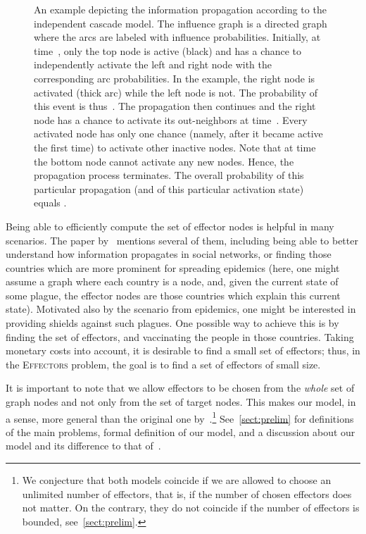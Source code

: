 \documentclass{article}
\newcommand{\probEffectors}{\textsc{Effectors}\xspace}
\begin{document}
\begin{figure}
    \caption{An example depicting the information propagation according to the independent cascade model. The influence graph is a directed graph where the arcs are labeled with influence probabilities. Initially, at time~, only the top node is active (black) and has a chance to independently activate the left and right node with the corresponding arc probabilities.
      In the example, the right node is activated (thick arc) while the left node is not. The probability of this event is thus~. The propagation then continues and the right node has a chance to activate its out-neighbors at time~. Every activated node has only one chance (namely, after it became active the first time) to activate other inactive nodes. Note that at time~ the bottom node cannot activate any new nodes. Hence, the propagation process terminates. The overall probability of this particular propagation (and of this particular activation state) equals .
    }
  \label{fig:intro-example}
\end{figure}

Being able to efficiently compute the set of effector nodes is helpful in many scenarios.
The paper by~\citet{LTGMH10} mentions several of them,
including being able to better understand how information propagates in social networks,
or finding those countries which are more prominent for spreading epidemics
(here, one might assume a graph where each country is a node,
and,
given the current state of some plague,
the effector nodes are those countries which explain this current state).
Motivated also by the scenario from epidemics,
one might be interested in providing shields against such plagues.
One possible way to achieve this is by finding the set of effectors,
and vaccinating the people in those countries.
Taking monetary costs into account,
it is desirable to find a small set of effectors;
thus,
in the \probEffectors problem,
the goal is to find a set of effectors of small size.



It is important to note that we allow effectors to be chosen from
the \emph{whole} set of graph nodes and not only from the set of target nodes.
This makes our model, in a sense, more general than the original one by~\citet{LTGMH10}.\footnote{We
conjecture that both models coincide if we are allowed to choose an unlimited number of effectors,
that is,
if the number of chosen effectors does not matter.
On the contrary, they do not coincide if the number of effectors is bounded,
see~\autoref{sect:prelim}.}
See~\autoref{sect:prelim} for definitions of the main problems,
formal definition of our model, and a discussion about our model and its difference to that of~\citet{LTGMH10}.
\end{document}
